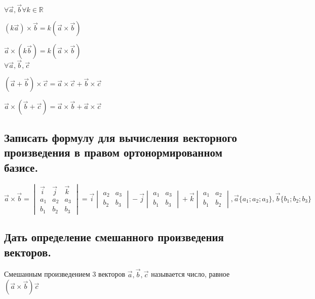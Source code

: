 \documentclass[a4paper, 10pt]{article}
\begin{document}
\begin{center}
    $\forall \vec{a}, \vec{b} \forall k \in \mathbb{R}$
    
    $(k\vec{a}) \times \vec{b} = k(\vec{a} \times \vec{b})$
    
    $\vec{a} \times (k\vec{b}) = k(\vec{a} \times \vec{b})$\\
    
    $\forall \vec{a}, \vec{b}, \vec{c}$
    
    $(\vec{a} + \vec{b}) \times \vec{c} = \vec{a} \times \vec{c} + \vec{b} \times \vec{c}$
    
    $\vec{a} \times (\vec{b} + \vec{c}) = \vec{a} \times \vec{b} + \vec{a} \times \vec{c}$
\end{center}

\subsection{Записать формулу для вычисления векторного произведения в правом ортонормированном базисе.}

\begin{center}
$\vec{a} \times \vec{b} = 
\begin{vmatrix}
    \vec{i}&\vec{j}&\vec{k}\\
    a_1 & a_2 & a_3\\
    b_1 & b_2 & b_3
\end{vmatrix} = \vec{i}
\begin{vmatrix}
    a_2 & a_3\\
    b_2 & b_3
\end{vmatrix} - \vec{j}
\begin{vmatrix}
    a_1 & a_3\\
    b_1 & b_3
\end{vmatrix} + \vec{k}
\begin{vmatrix}
    a_1 & a_2\\
    b_1 & b_2
\end{vmatrix}, \vec{a}\{a_1;a_2;a_3\},\vec{b}\{b_1;b_2;b_3\}$
\end{center}

\subsection{Дать определение смешанного произведения векторов.}

Смешанным произведением 3 векторов $\vec{a}, \vec{b}, \vec{c}$ называется число, равное 
$(\vec{a} \times \vec{b}) \vec{c}$
\end{document}
